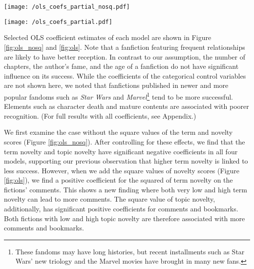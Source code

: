 \documentclass[letterpaper]{article} %
\begin{document}
\begin{figure*}
    \centering
          \texttt{[image: /ols\_coefs\_partial\_nosq.pdf]}
        \caption{OLS coefficients for the independent variables and selected control variables. 95\% confidence intervals are shown. The coefficients of the categorical variables are omitted. All coefficients are statistically significant ($p < 0.05$).}
        \label{fig:ols_nosq}
\end{figure*}

\begin{figure*}
    \centering
          \texttt{[image: /ols\_coefs\_partial.pdf]}
        \caption{OLS coefficients for the independent variables and selected control variables, adding the square values of term and topic novelty scores. 95\% confidence intervals are shown. The coefficients of the categorical variables are omitted. Except for the topic novelty squared in the models for Kudos and Hits, all other coefficients are statistically significant ($p < 0.05$).}
        \label{fig:ols}
\end{figure*}

Selected OLS coefficient estimates of each model are shown in Figure \ref{fig:ols_nosq} and \ref{fig:ols}. Note that a fanfiction featuring frequent relationships are likely to have better reception. In contrast to our assumption, the number of chapters, the author's fame, and the age of a fanfiction do not have significant influence on its success. While the coefficients of the categorical control variables are not shown here, we noted that fanfictions published in newer and more popular fandoms such as \emph{Star Wars} and \emph{Marvel}\footnote{These fandoms may have long histories, but recent installments such as Star Wars' new triology and the Marvel movies have brought in many new fans.} tend to be more successful. Elements such as character death and mature contents are associated with poorer recognition. (For full results with all coefficients, see Appendix.)

We first examine the case without the square values of the term and novelty scores (Figure \ref{fig:ols_nosq}). After controlling for these effects, we find that the term novelty and topic novelty have significant negative coefficients in all four models, supporting our previous observation that higher term novelty is linked to less success. However, when we add the square values of novelty scores (Figure \ref{fig:ols}), we find a positive coefficient for the squared of term novelty on the fictions' comments. This shows a new finding where both very low and high term novelty can lead to more comments. The square value of topic novelty, additionally, has significant positive coefficients for comments and bookmarks. Both fictions with low and high topic novelty are therefore associated with more comments and bookmarks. 
\end{document}

